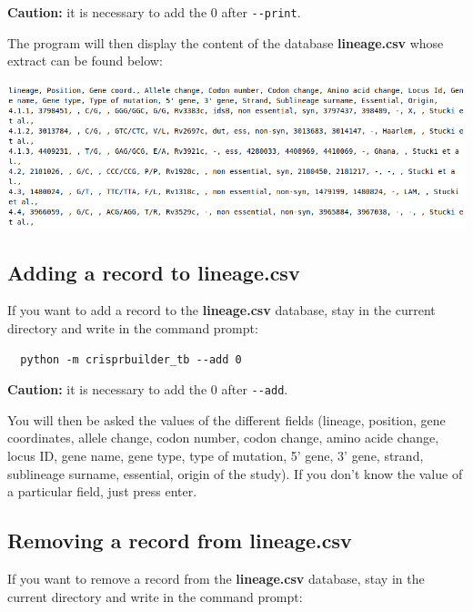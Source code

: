 \documentclass[twoside,a4paper,11pt,frenchb,openany]{report}
\begin{document}
    \textbf{Caution:} it is necessary to add the 0 after \texttt{-\/-print}.

The program will then display the content of the database
\textbf{lineage.csv} whose extract can be found below:

\includegraphics[width=16cm]{img_01.png}



    \subsection{Adding a record to
lineage.csv}\label{adding-a-record-to-lineage.csv}

    If you want to add a record to the \textbf{lineage.csv} database, stay
in the current directory and write in the command prompt:

    \begin{verbatim}
  python -m crisprbuilder_tb --add 0
\end{verbatim}

    \textbf{Caution:} it is necessary to add the 0 after \texttt{-\/-add}.

You will then be asked the values of the different fields (lineage,
position, gene coordinates, allele change, codon number, codon change,
amino acide change, locus ID, gene name, gene type, type of mutation, 5'
gene, 3' gene, strand, sublineage surname, essential, origin of the
study). If you don't know the value of a particular field, just
press enter.



    \subsection{Removing a record from
lineage.csv}\label{removing-a-record-from-lineage.csv}

    If you want to remove a record from the \textbf{lineage.csv} database,
stay in the current directory and write in the command
prompt:
\end{document}
